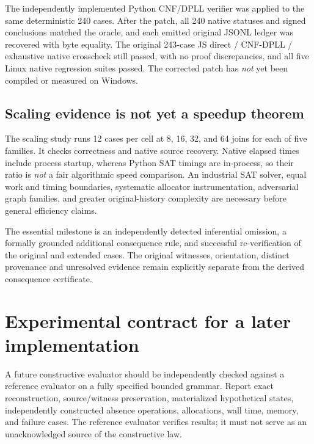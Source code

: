 \documentclass[11pt]{article}
\begin{document}
The independently implemented Python CNF/DPLL verifier
was applied to the same deterministic 240 cases.
After the patch, all 240 native statuses and signed
conclusions matched the oracle, and each emitted original
JSONL ledger was recovered with byte equality.
The original 243-case JS direct / CNF-DPLL / exhaustive
native crosscheck still passed, with no proof discrepancies,
and all five Linux native regression suites passed.
The corrected patch has \emph{not} yet been compiled
or measured on Windows.

\subsection{Scaling evidence is not yet a speedup theorem}
The scaling study runs 12 cases per cell at 8, 16, 32,
and 64 joins for each of five families. It checks correctness
and native source recovery. Native elapsed times include
process startup, whereas Python SAT timings are in-process,
so their ratio is \emph{not} a fair algorithmic speed
comparison. An industrial SAT solver, equal work and timing
boundaries, systematic allocator instrumentation, adversarial
graph families, and greater original-history complexity
are necessary before general efficiency claims.

The essential milestone is an independently detected
inferential omission, a formally grounded additional
consequence rule, and successful re-verification of
the original and extended cases. The original witnesses,
orientation, distinct provenance and unresolved
evidence remain explicitly separate from the derived
consequence certificate.

\section{Experimental contract for a later implementation}
A future constructive evaluator should be independently checked
against a reference evaluator on a fully specified bounded grammar.
Report exact reconstruction, source/witness preservation,
materialized hypothetical states, independently constructed absence
operations, allocations, wall time, memory, and failure cases.
The reference evaluator verifies results; it must not serve as an
unacknowledged source of the constructive law.
\end{document}
